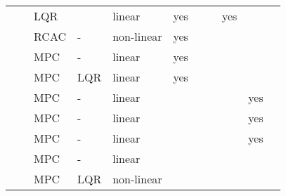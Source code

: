 \begin{landscape}
\begin{tiny}
\begin{table}[!htbp]
\begin{tabularx}{\linewidth}{@{}lllllllllll@{}}
            \citet{Slabber2020}          & \citeyear{Slabber2020}          & \gls{LQR}                  &                        & linear               & yes                &                  &                     & yes                &                    &                  \\
            \citet{Dai2014}              & \citeyear{Dai2014}              & \gls{RCAC}                 & -                      & non-linear           & yes                &                  &                     &                    &                    &                  \\
            \citet{Santos2016}           & \citeyear{Santos2016}           & \gls{MPC}                  & -                      & linear               & yes                &                  &                     &                    &                    &                  \\
            \citet{Andrade2016}          & \citeyear{Andrade2016}          & \gls{MPC}                  & \gls{LQR}              & linear               & yes                &                  &                     &                    &                    &                  \\
            \citet{Zurn2016}             & \citeyear{Zurn2016}             & \gls{MPC}                  & -                      & linear               &                    &                  &                     &                    & yes                &                  \\
            \citet{Son2019}              & \citeyear{Son2019}              & \gls{MPC}                  & -                      & linear               &                    &                  &                     &                    & yes                &                  \\
            \citet{Son2018}              & \citeyear{Son2018}              & \gls{MPC}                  & -                      & linear               &                    &                  &                     &                    & yes                &                  \\
            \citet{Son2017}              & \citeyear{Son2017}              & \gls{MPC}                  & -                      & linear               &                    &                  &                     &                    &                    &                  \\
            \citet{Trachte2014}          & \citeyear{Trachte2014}          & \gls{MPC}                  & \gls{LQR}              & non-linear           &                    &                  &                     &                    &                    &                  \\

\end{tabularx}
\end{table}
\end{tiny}
\end{landscape}
